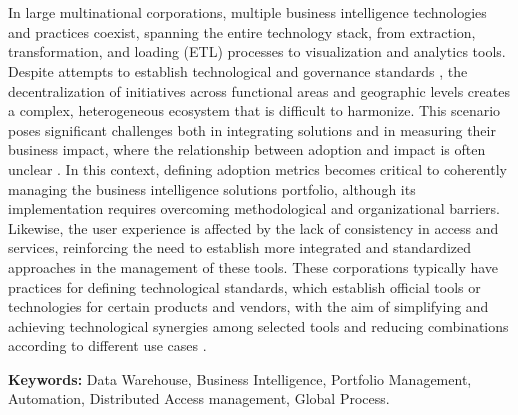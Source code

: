 \chapter*{\runtitle}

\noindent In large multinational corporations, multiple business intelligence technologies and practices coexist, spanning the entire technology stack, from extraction, transformation, and loading (ETL) processes \cite{inmon1992} to visualization and analytics tools. Despite attempts to establish technological and governance standards \cite{isaca2012}, the decentralization of initiatives across functional areas and geographic levels creates a complex, heterogeneous ecosystem that is difficult to harmonize. This scenario poses significant challenges both in integrating solutions and in measuring their business impact, where the relationship between adoption and impact is often unclear \cite{davenport2006}. In this context, defining adoption metrics becomes critical to coherently managing the business intelligence solutions portfolio, although its implementation requires overcoming methodological and organizational barriers. Likewise, the user experience is affected by the lack of consistency in access and services, reinforcing the need to establish more integrated and standardized approaches in the management of these tools.
These corporations typically have practices for defining technological standards, which establish official tools or technologies for certain products and vendors, with the aim of simplifying and achieving technological synergies among selected tools and reducing combinations according to different use cases \cite{jacobson1986}.

\bigskip

\noindent\textbf{Keywords:} Data Warehouse, Business Intelligence, Portfolio Management, Automation, Distributed Access management, Global Process.